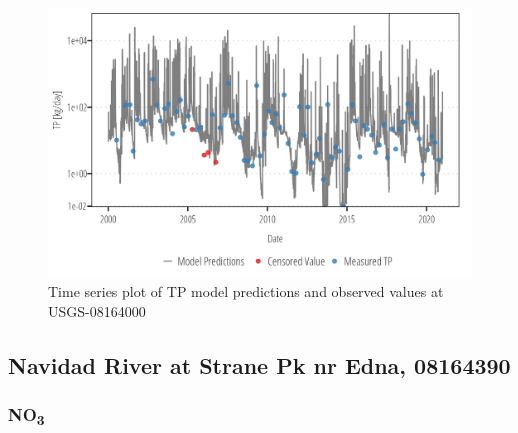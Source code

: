 \documentclass[
]{article}
\begin{document}
\begin{figure}[h]

{\centering \includegraphics{model_assessment_files/figure-pdf/unnamed-chunk-13-1.png}

}

\caption{Time series plot of TP model predictions and observed values at
USGS-08164000}

\end{figure}

\clearpage

\hypertarget{navidad-river-at-strane-pk-nr-edna-08164390}{%
\subsection{Navidad River at Strane Pk nr Edna,
08164390}\label{navidad-river-at-strane-pk-nr-edna-08164390}}

\hypertarget{no3}{%
\subsubsection{\texorpdfstring{NO\textsubscript{3}}{NO3}}\label{no3}}
\end{document}

